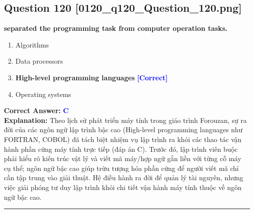 \documentclass[11pt,a4paper]{article}
\begin{document}
\begin{minipage}{\textwidth}
\subsection*{Question 120 \quad \footnotesize{[0120\_q120\_Question\_120.png]}}
\noindent \textbf{separated the programming task from computer operation tasks.}

\begin{enumerate}[label=\Alph*.]
    \item Algorithms
    \item Data processors
    \item \textbf{High-level programming languages} \hfill \textcolor{blue}{\textbf{[Correct]}}
    \item Operating systems
\end{enumerate}

\noindent \textbf{Correct Answer:} \textcolor{blue}{\textbf{C}} \\[2pt]
\noindent \textbf{Explanation:} Theo lịch sử phát triển máy tính trong giáo trình Forouzan, sự ra đời của các ngôn ngữ lập trình bậc cao (High-level programming languages như FORTRAN, COBOL) đã tách biệt nhiệm vụ lập trình ra khỏi các thao tác vận hành phần cứng máy tính trực tiếp (đáp án C). Trước đó, lập trình viên buộc phải hiểu rõ kiến trúc vật lý và viết mã máy/hợp ngữ gắn liền với từng cỗ máy cụ thể; ngôn ngữ bậc cao giúp trừu tượng hóa phần cứng để người viết mã chỉ cần tập trung vào giải thuật. Hệ điều hành ra đời để quản lý tài nguyên, nhưng việc giải phóng tư duy lập trình khỏi chi tiết vận hành máy tính thuộc về ngôn ngữ bậc cao.

\par\vspace{0.3cm}
\hrule
\vspace{0.3cm}
\end{minipage}
\end{document}
